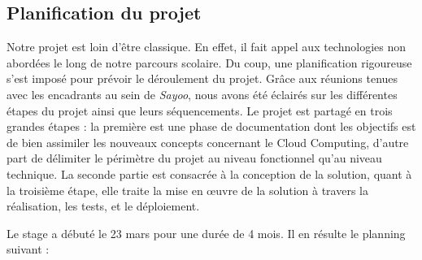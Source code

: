 \begin{onehalfspace}
\section{Planification du projet}

Notre projet est loin d'être classique. En effet, il fait appel aux technologies non abordées le long de notre parcours scolaire. Du coup, une planification rigoureuse s'est imposé pour prévoir le déroulement du projet. Grâce aux réunions tenues avec les encadrants au sein de \emph{Sayoo}, nous avons été éclairés sur les différentes étapes du projet ainsi que leurs séquencements. Le projet est partagé en trois grandes étapes : la première est une phase de documentation dont les objectifs est de bien assimiler les nouveaux concepts concernant le Cloud Computing, d'autre part de délimiter le périmètre du projet au niveau fonctionnel qu'au niveau technique. La seconde partie est consacrée à la conception de la solution, quant à la troisième étape, elle traite la mise en œuvre de la solution à travers la réalisation, les tests, et le déploiement.

Le stage a débuté le 23 mars pour une durée de 4 mois. Il en résulte le planning suivant :


\end{onehalfspace}
